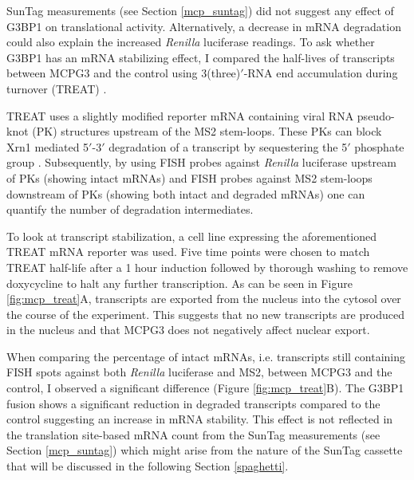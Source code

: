SunTag measurements (see Section \ref{mcp_suntag}) did not suggest any effect of G3BP1 on translational activity.
Alternatively, a decrease in mRNA degradation could also explain the increased \textit{Renilla} luciferase readings.
To ask whether G3BP1 has an mRNA stabilizing effect, I compared the half-lives of transcripts between MCPG3 and the control using 3(three)$'$-RNA end accumulation during turnover (TREAT) \cite{horvathova_dynamics_2017}.

TREAT uses a slightly modified reporter mRNA containing viral RNA pseudo-knot (PK) structures upstream of the MS2 stem-loops.
These PKs can block Xrn1 mediated 5$'$-3$'$ degradation of a transcript by sequestering the 5$'$ phosphate group \cite{kieft_new_2015}.
Subsequently, by using FISH probes against \textit{Renilla} luciferase upstream of PKs (showing intact mRNAs) and FISH probes against MS2 stem-loops downstream of PKs (showing both intact and degraded mRNAs) one can quantify the number of degradation intermediates.

To look at transcript stabilization, a cell line expressing the aforementioned TREAT mRNA reporter was used.
Five time points were chosen to match TREAT half-life after a 1 hour induction followed by thorough washing to remove doxycycline to halt any further transcription.
As can be seen in Figure \ref{fig:mcp_treat}A, transcripts are exported from the nucleus into the cytosol over the course of the experiment.
This suggests that no new transcripts are produced in the nucleus and that MCPG3 does not negatively affect nuclear export.

When comparing the percentage of intact mRNAs, i.e. transcripts still containing FISH spots against both \textit{Renilla} luciferase and MS2, between MCPG3 and the control, I observed a significant difference (Figure \ref{fig:mcp_treat}B).
The G3BP1 fusion shows a significant reduction in degraded transcripts compared to the control suggesting an increase in mRNA stability.
This effect is not reflected in the translation site-based mRNA count from the SunTag measurements (see Section \ref{mcp_suntag}) which might arise from the nature of the SunTag cassette that will be discussed in the following Section \ref{spaghetti}.



